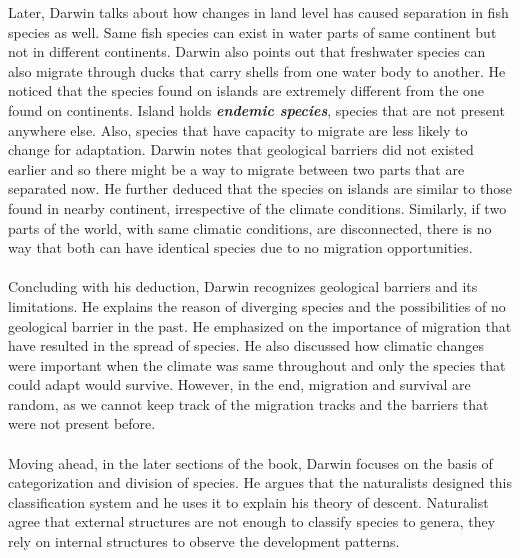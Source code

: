 \documentclass{article}
\begin{document}
	Later, Darwin talks about how changes in land level has caused separation in fish species as well. Same fish species can exist in water parts of same continent but not in different continents. Darwin also points out that freshwater species can also migrate through ducks that carry shells from one water body to another. He noticed that the species found on islands are extremely different from the one found on continents. Island holds \textbf{\textit{endemic species}}, species that are not present anywhere else. Also, species that have capacity to migrate are less likely to change for adaptation. Darwin notes that geological barriers did not existed earlier and so there might be a way to migrate between two parts that are separated now. He further deduced that the species on islands are similar to those found in nearby continent, irrespective of the climate conditions. Similarly, if two parts of the world, with same climatic conditions, are disconnected, there is no way that both can have identical species due to no migration opportunities. \\ \\
	Concluding with his deduction, Darwin recognizes geological barriers and its limitations. He explains the reason of diverging species and the possibilities of no geological barrier in the past. He emphasized on the importance of migration that have resulted in the spread of species. He also discussed how climatic changes were important when the climate was same throughout and only the species that could adapt would survive. However, in the end, migration and survival are random, as we cannot keep track of the migration tracks and the barriers that were not present before. \\ \\
	Moving ahead, in the later sections of the book, Darwin focuses on the basis of categorization and division of species. He argues that the naturalists designed this classification system and he uses it to explain his theory of descent. Naturalist agree that external structures are not enough to classify species to genera, they rely on internal structures to observe the development patterns. \\ \\
\end{document}
